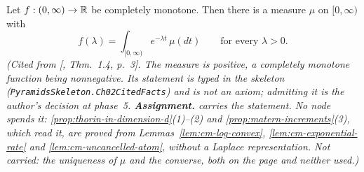 \begin{theorem}
\label{thm:cited-A55}
\notready
Let $f : (0,\infty) \to \mathbb{R}$ be completely monotone. Then there is a measure $\mu$ on $[0,\infty)$
with
\[
  f(\lambda) = \int_{[0,\infty)}e^{-\lambda t}\,\mu(dt) \qquad\text{for every } \lambda > 0 .
\]
\statusA\quad{}\quad\emph{(Cited from [, Thm.~1.4, p.~3].
The measure is positive, a completely monotone function being nonnegative. Its statement is typed in the skeleton
(\texttt{PyramidsSkeleton.Ch02CitedFacts}) and is not an axiom; admitting it is the author's decision at phase~5. \textbf{Assignment.}  carries the statement.
No node spends it: \ref{prop:thorin-in-dimension-d}(1)--(2) and \ref{prop:matern-increments}(3),
which read it, are proved from Lemmas~\ref{lem:cm-log-convex}, \ref{lem:cm-exponential-rate} and
\ref{lem:cm-uncancelled-atom}, without a Laplace representation. Not carried:
the uniqueness of $\mu$ and the converse, both on the page and neither used.)}
\end{theorem}

